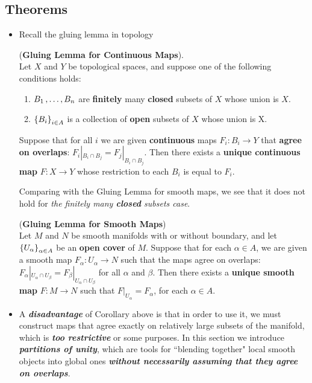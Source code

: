 \documentclass[11pt]{article}
\begin{document}
\subsection{Theorems}
\begin{itemize}
\item Recall the gluing lemma in topology
\begin{lemma}(\textbf{Gluing Lemma for Continuous Maps}). \\
Let $X$ and $Y$ be topological spaces, and suppose one of the following conditions holds:
\begin{enumerate}
\item  $B_1 \,{,}\ldots{,}\, B_n$ are \textbf{finitely} many \textbf{closed} subsets of $X$ whose union is $X$.
\item  $\left\{B_i\right\}_{i\in A}$ is a collection of \textbf{open} subsets of $X$ whose union is X.
\end{enumerate}
Suppose that for all $i$ we are given \textbf{continuous} maps $F_i: B_i \rightarrow Y$ that \textbf{agree on overlaps}: $F_i|_{B_i \cap B_j} = F_j|_{B_i \cap B_j}$. Then there exists a \textbf{unique continuous map} $F: X \rightarrow Y$ whose restriction to each $B_i$ is equal to $F_i$.
\end{lemma}

Comparing with the Gluing Lemma for smooth maps, we see that it does not hold for \emph{the finitely many \textbf{closed} subsets case}.
 \begin{corollary} (\textbf{Gluing Lemma for Smooth Maps}) \citep{lee2003introduction}\\
 Let $M$ and $N$ be smooth manifolds with or without boundary, and let $\left\{U_{\alpha}\right\}_{\alpha \in A}$ be an \textbf{open cover} of $M$. Suppose that for each $\alpha \in A$, we are given a smooth map $F_{\alpha}: U_{\alpha} \rightarrow N$ such that the maps agree on overlaps: $F_{\alpha}|_{U_{\alpha}\cap U_{\beta}} = F_{\beta}|_{U_{\alpha}\cap U_{\beta}}$ for all $\alpha$ and $\beta$. Then there exists a \textbf{unique smooth map} $F: M \rightarrow N$ such that $F|_{U_{\alpha}} = F_{\alpha}$, for each $\alpha \in A$.
\end{corollary}

\item 
\begin{remark}
A \emph{\textbf{disadvantage}} of Corollary above is that in order to use it, we must construct maps that agree exactly on relatively large subsets of the manifold, which is \emph{\textbf{too restrictive}} or some purposes. In this section we introduce \emph{\textbf{partitions of unity}}, which are tools for ``blending together" local smooth objects into global ones \emph{\textbf{without necessarily assuming that they agree on overlaps}}. 
\end{remark}


\end{itemize}
\end{document}
